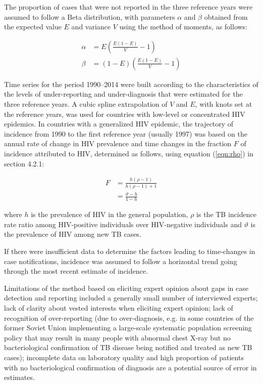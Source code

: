 The proportion of cases that were not reported in the three reference years were assumed to follow a Beta distribution, with parameters $\alpha$ and $\beta$ obtained from the expected value $E$ and variance $V$ using the method of moments\cite{Renyi2007}, as follows: 

\begin{equation}
\begin{align}
\alpha &= E \left(\frac{E(1-E)}{V} - 1 \right) \\
\beta  &= (1-E)\left(\frac{E(1-E)}{V} - 1 \right)
\label{eqn:betamoments}
\end{align}
\end{equation}

Time series for the period 1990–2014 were built according to the characteristics of the levels of under-reporting and under-diagnosis that were estimated for the three reference years. A cubic spline extrapolation of $V$ and $E$, with knots set at the reference years, was used for countries with low-level or concentrated HIV epidemics. In countries with a generalized HIV epidemic, the trajectory of incidence from 1990 to the first reference year (usually 1997) was based on the annual rate of change in HIV prevalence and time changes in the fraction $F$ of incidence attributed to HIV, determined as follows, using equation (\ref{eqn:rho}) in section 4.2.1:

\begin{align*}
F &= \frac{h(\rho - 1)}{h(\rho - 1) + 1} \\
  &= \frac{\vartheta - h}{1 - h}
\end{align*}

where $h$ is the prevalence of HIV in the general population, $\rho$ is the TB incidence rate ratio among HIV-positive individuals over HIV-negative individuals and $\vartheta$ is the prevalence of HIV among new TB cases.

If there were insufficient data to determine the factors leading to time-changes in case notifications, incidence was assumed to follow a horizontal trend going through the most recent estimate of incidence. 

Limitations of the method based on eliciting expert opinion about gaps in case detection and reporting included a generally small number of interviewed experts; lack of clarity about vested interests when eliciting expert opinion; lack of recognition of over-reporting (due to over-diagnosis,  e.g. in some countries of the former Soviet Union implementing a large-scale systematic population screening policy that may result in many people with abnormal chest X-ray but no bacteriological confirmation of TB disease being notified and treated as new TB cases); incomplete data on laboratory quality and high proportion of patients with no bacteriological confirmation of diagnosis are a potential source of error in estimates.



